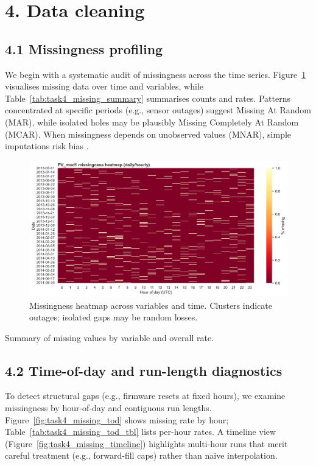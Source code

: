 \documentclass[12pt,a4paper]{article}
\begin{document}
\section*{4. Data cleaning}

\subsection*{4.1 Missingness profiling}
We begin with a systematic audit of missingness across the time series. Figure~\ref{fig:task4_missing_heatmap} visualises missing data over time and variables, while Table~\ref{tab:task4_missing_summary} summarises counts and rates. Patterns concentrated at specific periods (e.g., sensor outages) suggest Missing At Random (MAR), while isolated holes may be plausibly Missing Completely At Random (MCAR). When missingness depends on unobserved values (MNAR), simple imputations risk bias \cite{Little2002}.

\begin{figure}[H]
  \centering
  \includegraphics[width=0.95\linewidth]{task4_fig_missing_heatmap.png}
  \caption{Missingness heatmap across variables and time. Clusters indicate outages; isolated gaps may be random losses.}
  \label{fig:task4_missing_heatmap}
\end{figure}

\begin{table}[H]
  \centering
  \caption{Summary of missing values by variable and overall rate.}
  \label{tab:task4_missing_summary}
\end{table}

\subsection*{4.2 Time-of-day and run-length diagnostics}
To detect structural gaps (e.g., firmware resets at fixed hours), we examine missingness by hour-of-day and contiguous run lengths. Figure~\ref{fig:task4_missing_tod} shows missing rate by hour; Table~\ref{tab:task4_missing_tod_tbl} lists per-hour rates. A timeline view (Figure~\ref{fig:task4_missing_timeline}) highlights multi-hour runs that merit careful treatment (e.g., forward-fill caps) rather than naive interpolation.
\end{document}
